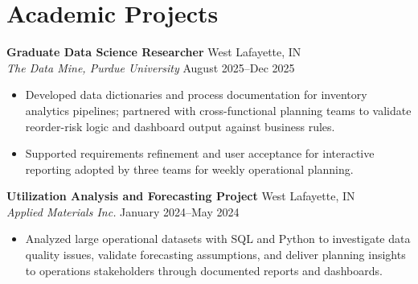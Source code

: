 \documentclass[11pt,a4paper]{article}
\begin{document}
\section*{Academic Projects}
\noindent
\textbf{Graduate Data Science Researcher} \hfill West Lafayette, IN \\
\textit{The Data Mine, Purdue University} \hfill August 2025--Dec 2025
\begin{itemize}[leftmargin=*, noitemsep, topsep=0pt]
    \item Developed data dictionaries and process documentation for inventory analytics pipelines; partnered with cross-functional planning teams to validate reorder-risk logic and dashboard output against business rules.
    \item Supported requirements refinement and user acceptance for interactive reporting adopted by three teams for weekly operational planning.
\end{itemize}
\vspace{6pt}

\noindent
\textbf{Utilization Analysis and Forecasting Project} \hfill West Lafayette, IN \\
\textit{Applied Materials Inc.} \hfill January 2024--May 2024
\begin{itemize}[leftmargin=*, noitemsep, topsep=0pt]
    \item Analyzed large operational datasets with SQL and Python to investigate data quality issues, validate forecasting assumptions, and deliver planning insights to operations stakeholders through documented reports and dashboards.
\end{itemize}
\end{document}
